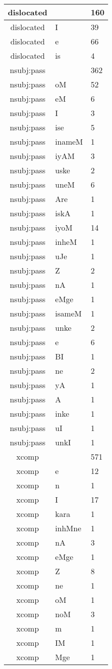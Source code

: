 \documentclass[a4 paper]{article}
\begin{document}
\begin{longtable}{cp{}p{}}
dislocated &  & 160\\ \midrule dislocated & I & 39\\ \midrule dislocated & e & 66\\ \midrule dislocated & is & 4\\ \midrule 
nsubj:pass &  & 362\\ \midrule nsubj:pass & oM & 52\\ \midrule nsubj:pass & eM & 6\\ \midrule nsubj:pass & I & 3\\ \midrule nsubj:pass & ise & 5\\ \midrule nsubj:pass & inameM & 1\\ \midrule nsubj:pass & iyAM & 3\\ \midrule nsubj:pass & uske & 2\\ \midrule nsubj:pass & uneM & 6\\ \midrule nsubj:pass & Are & 1\\ \midrule nsubj:pass & iskA & 1\\ \midrule nsubj:pass & iyoM & 14\\ \midrule nsubj:pass & inheM & 1\\ \midrule nsubj:pass & uJe & 1\\ \midrule nsubj:pass & Z & 2\\ \midrule nsubj:pass & nA & 1\\ \midrule nsubj:pass & eMge & 1\\ \midrule nsubj:pass & isameM & 1\\ \midrule nsubj:pass & unke & 2\\ \midrule nsubj:pass & e & 6\\ \midrule nsubj:pass & BI & 1\\ \midrule nsubj:pass & ne & 2\\ \midrule nsubj:pass & yA & 1\\ \midrule nsubj:pass & A & 1\\ \midrule nsubj:pass & inke & 1\\ \midrule nsubj:pass & uI & 1\\ \midrule nsubj:pass & unkI & 1\\ \midrule 
xcomp &  & 571\\ \midrule xcomp & e & 12\\ \midrule xcomp & n & 1\\ \midrule xcomp & I & 17\\ \midrule xcomp & kara & 1\\ \midrule xcomp & inhMne & 1\\ \midrule xcomp & nA & 3\\ \midrule xcomp & eMge & 1\\ \midrule xcomp & Z & 8\\ \midrule xcomp & ne & 1\\ \midrule xcomp & oM & 1\\ \midrule xcomp & noM & 3\\ \midrule xcomp & m & 1\\ \midrule xcomp & IM & 1\\ \midrule xcomp & Mge & 1\\ \midrule 

\end{longtable}
\end{document}
